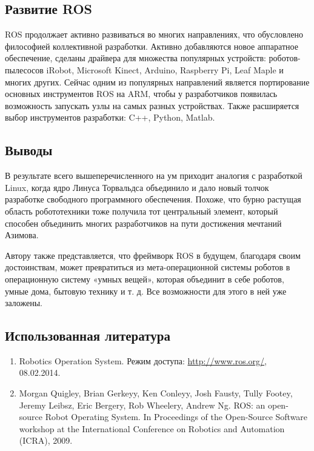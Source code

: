 \documentclass[10pt, a5paper]{article}
\begin{document}
\subsection*{Развитие ROS}

ROS продолжает активно развиваться во многих направлениях, что обусловлено философией коллективной разработки. Активно добавляются новое аппаратное обеспечение, сделаны драйвера для множества популярных устройств: роботов-пылесосов iRobot, Microsoft Kinect, Arduino, Raspberry Pi, Leaf Maple и многих других. Сейчас одним из популярных направлений является портирование основных инструментов ROS на ARM, чтобы у разработчиков появилась возможность запускать узлы на самых разных устройствах. Также расширяется выбор инструментов разработки: C++, Python, Matlab.

\subsection*{Выводы}

В результате всего вышеперечисленного на ум приходит аналогия с разработкой Linux, когда ядро Линуса Торвальдса объединило и дало новый толчок разработке свободного программного обеспечения. Похоже, что бурно растущая область робототехники тоже получила тот центральный элемент, который способен объединить  многих разработчиков на пути достижения мечтаний Азимова.

Автору также представляется, что фреймворк ROS в будущем, благодаря своим достоинствам, может превратиться из мета-операционной системы роботов в  операционную систему «умных вещей», которая объединит в себе роботов, умные дома, бытовую технику и т. д. Все возможности для этого в ней уже заложены.

\subsection*{Использованная литература}
\begin{enumerate}
\item Robotics Operation System. Режим доступа: \url{http://www.ros.org/}, 08.02.2014.
\item Morgan Quigley, Brian Gerkeyy, Ken Conleyy, Josh Fausty, Tully Footey, Jeremy Leibsz, Eric Bergery, Rob Wheelery, Andrew Ng. ROS: an open-source Robot Operating System. In Proceedings of the Open-Source Software workshop at the International Conference on Robotics and Automation (ICRA), 2009.
\end{enumerate}
\end{document}
